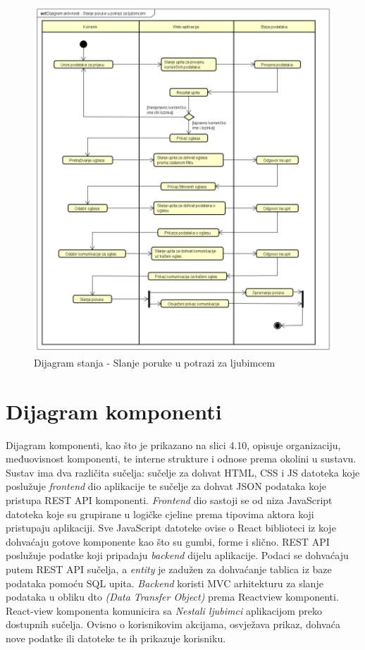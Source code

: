 			\begin{figure}[!htb]
				\centering
				\includegraphics[width=\textwidth]{slike/Dijagram_aktivnosti_-_Slanje_poruke_u_potrazi_za_ljubimcem.png}
				\caption{Dijagram stanja - Slanje poruke u potrazi za ljubimcem}
			\end{figure}

                \clearpage
                \newpage
                \eject
   
		\section{Dijagram komponenti}
		
			\noindent Dijagram komponenti, kao što je prikazano na slici 4.10, opisuje organizaciju, međuovisnost komponenti, te interne strukture i odnose prema okolini u sustavu. Sustav ima dva različita sučelja: sučelje za dohvat HTML, CSS i JS datoteka koje poslužuje \textit{frontend} dio aplikacije te sučelje za dohvat JSON podataka koje pristupa REST API komponenti. \textit{Frontend} dio sastoji se od niza JavaScript datoteka koje su grupirane u logičke cjeline prema tipovima aktora koji pristupaju aplikaciji. Sve JavaScript datoteke ovise o React biblioteci iz koje dohvaćaju gotove komponente kao što su gumbi, forme i slično. REST API poslužuje podatke koji pripadaju \textit{backend} dijelu aplikacije. Podaci se dohvaćaju putem REST API sučelja, a \textit{entity} je zadužen za dohvaćanje tablica iz baze podataka pomoću SQL upita. \textit{Backend} koristi MVC arhitekturu za slanje podataka u obliku dto \textit{(Data Transfer Object)} prema Reactview komponenti. React-view komponenta komunicira sa \textit{Nestali ljubimci} aplikacijom preko dostupnih sučelja. Ovisno o korisnikovim akcijama, osvježava prikaz, dohvaća nove podatke ili datoteke te ih prikazuje korisniku.

